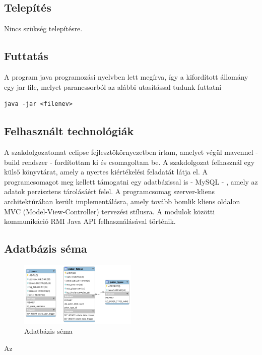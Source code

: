 \subsection{Telepítés}
Nincs szükség telepítésre.
\subsection{Futtatás}
A program java programozási nyelvben lett megírva, így a kifordított állomány egy jar file, melyet parancssorból az alábbi utasítással tudunk futtatni
\begin{lstlisting}
java -jar <filenev>
\end{lstlisting}
\subsection{Felhasznált technológiák}
A szakdolgozatomat eclipse fejlesztőkörnyezetben írtam, amelyet végül mavennel - build rendszer - fordítottam ki és csomagoltam be. A szakdolgozat felhasznál egy külső könyvtárat, amely a nyertes kiértékelési feladatát látja el. A programcsomagot meg kellett támogatni egy adatbázissal is - MySQL - , amely az adatok perzisztens tárolásáért felel. A programcsomag szerver-kliens architektúrában került implementálásra, amely tovább bomlik kliens oldalon MVC (Model-View-Controller) tervezési stílusra. A modulok közötti kommunikáció RMI Java API felhasználásával történik.
\subsection{Adatbázis séma}
\begin{figure}[h!]
  \caption{Adatbázis séma}
  \centering
    \includegraphics[width=0.5\textwidth]{user-documentation/images/db_scheme.png}
\end{figure}
Az
